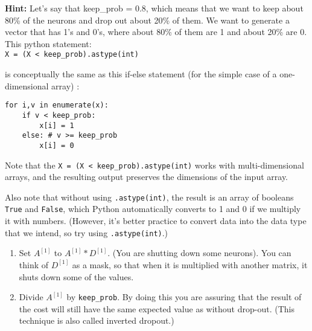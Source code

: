 \documentclass[11pt]{article}
\providecommand{\tightlist}{%
      \setlength{\itemsep}{0pt}\setlength{\parskip}{0pt}}
\begin{document}
\textbf{Hint:} Let's say that keep\_prob = 0.8, which means that we want
to keep about 80\% of the neurons and drop out about 20\% of them. We
want to generate a vector that has 1's and 0's, where about 80\% of them
are 1 and about 20\% are 0. This python statement:\\
\texttt{X\ =\ (X\ \textless{}\ keep\_prob).astype(int)}

is conceptually the same as this if-else statement (for the simple case
of a one-dimensional array) :

\begin{verbatim}
for i,v in enumerate(x):
    if v < keep_prob:
        x[i] = 1
    else: # v >= keep_prob
        x[i] = 0
\end{verbatim}

Note that the \texttt{X\ =\ (X\ \textless{}\ keep\_prob).astype(int)}
works with multi-dimensional arrays, and the resulting output preserves
the dimensions of the input array.

Also note that without using \texttt{.astype(int)}, the result is an
array of booleans \texttt{True} and \texttt{False}, which Python
automatically converts to 1 and 0 if we multiply it with numbers.
(However, it's better practice to convert data into the data type that
we intend, so try using \texttt{.astype(int)}.)

\begin{enumerate}
\def\labelenumi{\arabic{enumi}.}
\setcounter{enumi}{2}
\tightlist
\item
  Set \(A^{[1]}\) to \(A^{[1]} * D^{[1]}\). (You are shutting down some
  neurons). You can think of \(D^{[1]}\) as a mask, so that when it is
  multiplied with another matrix, it shuts down some of the values.
\item
  Divide \(A^{[1]}\) by \texttt{keep\_prob}. By doing this you are
  assuring that the result of the cost will still have the same expected
  value as without drop-out. (This technique is also called inverted
  dropout.)
\end{enumerate}
\end{document}
